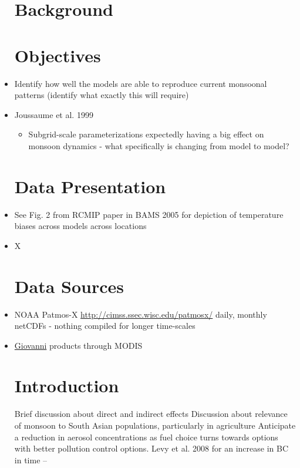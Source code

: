\documentclass[11pt,reqno]{amsart}
\begin{document}
\begin{itemize}
\section{Background}


\section{Objectives}
\item Identify how well the models are able to reproduce current monsoonal patterns (identify what exactly this will require) 

\item Joussaume et al. 1999 
	\begin{itemize}
	\item Subgrid-scale parameterizations expectedly having a big effect on monsoon dynamics - what specifically is changing from model to model?  
	
	
	\end{itemize}


\section{Data Presentation}
\item See Fig. 2 from RCMIP paper in BAMS 2005 for depiction of temperature biases across models across locations 

\item X







\section{Data Sources}
\item NOAA Patmos-X  \href{http://cimss.ssec.wisc.edu/patmosx/}{http://cimss.ssec.wisc.edu/patmosx/} daily, monthly netCDFs - nothing compiled for longer time-scales
\item \href{http://gdata1.sci.gsfc.nasa.gov/daac-bin/G3/gui.cgi?instance_id=MODIS_DAILY_L3&gsid=MODIS_DAILY_L3_160.39.231.134_1402350812&selectedWSID=140235120431683&app=latlonplot_diff&selectedMap=}{Giovanni} products through MODIS 


\section{Introduction}

Brief discussion about direct and indirect effects
Discussion about relevance of monsoon to South Asian populations, particularly in agriculture 
Anticipate a reduction in aerosol concentrations as fuel choice turns towards options with better pollution control options.  
Levy et al. 2008 for an increase in BC in time -- 


\end{itemize}
\end{document}
